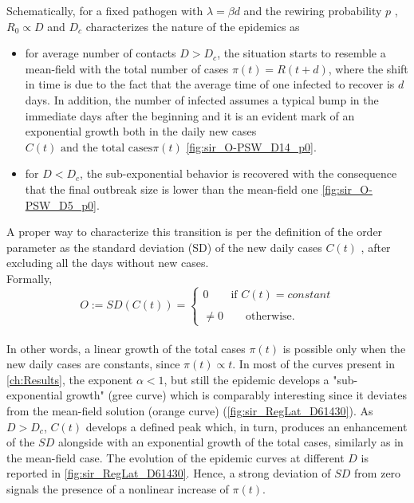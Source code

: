 \documentclass[a4paper,10pt,twoside]{book} %
\theoremstyle{definition}
\begin{document}
Schematically, for a fixed pathogen with $\lambda = \beta d$ and the rewiring probability $p$ , $R_0 \propto D$ and $D_c$ characterizes the nature of the epidemics as \cite{Thurner::NetBasedExpl}
\begin{itemize}
	\item for average number of contacts $D>D_c$, the situation starts to resemble a mean-field with the total number of cases $\pi(t) = R(t+d)$, where the shift in time is due to the fact that the average time of one infected to recover is $d$ days. In addition, the number of infected assumes a typical bump in the immediate days after the beginning and it is an evident mark of an exponential growth both in the daily new cases $C(t) \text{ and the total cases} \pi(t)$ \autoref{fig:sir_O-PSW_D14_p0}.
	\item for $D<D_c$, the sub-exponential behavior is recovered with the consequence that the final outbreak size is lower than the mean-field one \autoref{fig:sir_O-PSW_D5_p0}.
\end{itemize}
A proper way to characterize this transition is per the definition of the order parameter \cite{Thurner::NetBasedExpl} as the standard deviation (SD) of the new daily cases $ C(t)$ , after excluding all the days without new cases.
\\Formally,
\begin{equation}
	O := SD(C(t)) = 
	\begin{cases}
		0 \qquad \text{if $C(t) = constant$}\\\\
		\neq 0 \qquad \text{otherwise.} 
	\end{cases}
	\label{eq:def_OrdP}
\end{equation}
\\In other words, a linear growth of the total cases $ \pi(t)$ is possible only when the new daily cases are constants, since $\pi(t) \propto t$. In most of the curves present in \autoref{ch:Results}, the exponent $ \alpha < 1$, but still the epidemic develops a "sub-exponential growth" (gree curve) which is comparably interesting since it deviates from the mean-field solution (orange curve) (\autoref{fig:sir_RegLat_D61430}).  
As $D > D_c$, $C(t)$ develops a defined peak which, in turn, produces an enhancement of the $SD$ alongside with an exponential growth of the total cases, similarly as in the mean-field case. The evolution of the epidemic curves at different $D$ is reported in \autoref{fig:sir_RegLat_D61430}. Hence, a strong deviation of $SD$ from zero signals the presence of a nonlinear increase of $\pi(t)$.
\end{document}
